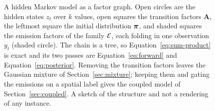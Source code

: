 \begin{figure}[htbp]
\centering
{}
\caption{A hidden Markov model as a factor graph. Open circles are the hidden
states $z_t$ over $k$ values, open squares the transition factors
$\mathbf{A}$, the leftmost square the initial distribution $\boldsymbol{\pi}$, and shaded
squares the emission factors of the family $\mathcal{E}$, each folding in one
observation $y_t$ (shaded circle). The chain is a tree, so
Equation~\ref{eq:sum-product} is exact and its two passes are
Equation~\ref{eq:forward} and Equation~\ref{eq:posterior}. Removing the
transition factors leaves the Gaussian mixture of
Section~\ref{sec:mixture}; keeping them and gating the emissions on a spatial
label gives the coupled model of Section~\ref{sec:coupled}. A sketch of the
structure and not a rendering of any instance.}
\label{fig:hmm:sketch}
\end{figure}
